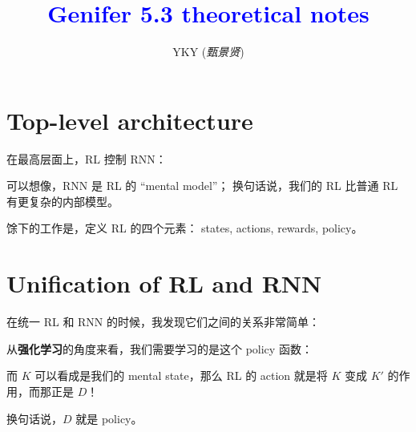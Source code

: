 \documentclass[12pt]{article}
\title{\textcolor{blue}{Genifer 5.3 theoretical notes}}
\author{YKY (\textit{甄景贤})}
\newcommand{\tab}{\hspace*{1cm}}
\begin{document}


{\let\newpage\relax\maketitle}

\maketitle
\setlength{\parindent}{0em}
\setlength{\parskip}{2.5ex plus0.5ex minus1.2ex}

\section{Top-level architecture}

在最高层面上，RL 控制 RNN：

\begin{center}
\end{center}

可以想像，RNN 是 RL 的 ``mental model''； 换句话说，我们的 RL 比普通 RL 有更复杂的内部模型。

馀下的工作是，定义 RL 的四个元素： states, actions, rewards, policy。

\section{Unification of RL and RNN}

在统一 RL 和 RNN 的时候，我发现它们之间的关系非常简单：

从\textbf{强化学习}的角度来看，我们需要学习的是这个 policy 函数：
\begin{center}
\end{center}
而 $K$ 可以看成是我们的 mental state，那么 RL 的 action 就是将 $K$ 变成 $K'$ 的作用，而那正是 $D$！
\begin{center}
\end{center}
换句话说，$D$ 就是 policy。
\end{document}
